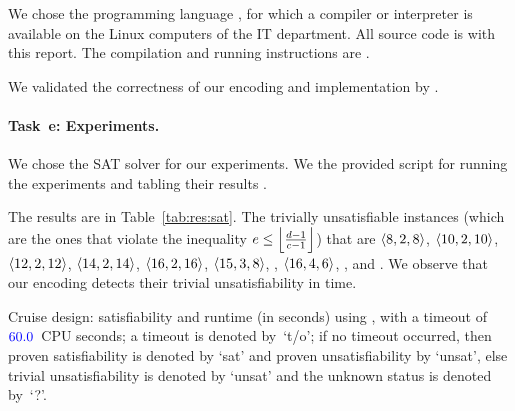 We chose the programming language \todo{\filler}, for which a compiler
or interpreter is available on the Linux computers of the IT
department.  All source code is  with this report.  The
compilation and running instructions are \todo{\filler}.

We validated the correctness of our encoding and implementation by
.

\paragraph{Task~e: Experiments.}
We chose the SAT solver \SolverSAT for our experiments.
%
We  the provided script for running the
experiments and tabling their results
.

The results are in Table~\ref{tab:res:sat}.
%
The trivially unsatisfiable instances (which are the ones that violate
the inequality $e \leq \left\lfloor\frac{d-1}{c-1}\right\rfloor$) that  are
$\langle8,2,8\rangle$, $\langle10,2,10\rangle$, $\langle12,2,12\rangle$,
$\langle14,2,14\rangle$, $\langle16,2,16\rangle$, $\langle15,3,8\rangle$,
\todo{\filler}, $\langle16,4,6\rangle$, \todo{\filler}, and \todo{\filler}.
%
We observe that our encoding detects their trivial unsatisfiability in
\todo{\filler} time.

\begin{table}[t]  %
  \centering
  
  \caption{Cruise design: satisfiability and runtime (in seconds)
    using \SolverSAT, with a timeout of ${\color{blue}60.0}$~CPU seconds; a
    timeout is denoted by~`t/o'; if no timeout occurred, then proven
    satisfiability is denoted by `sat' and proven unsatisfiability by
    `unsat', else trivial unsatisfiability is denoted by `unsat' and
    the unknown status is denoted by~`?'.}
  \label{tab:res:sat}
\end{table}

